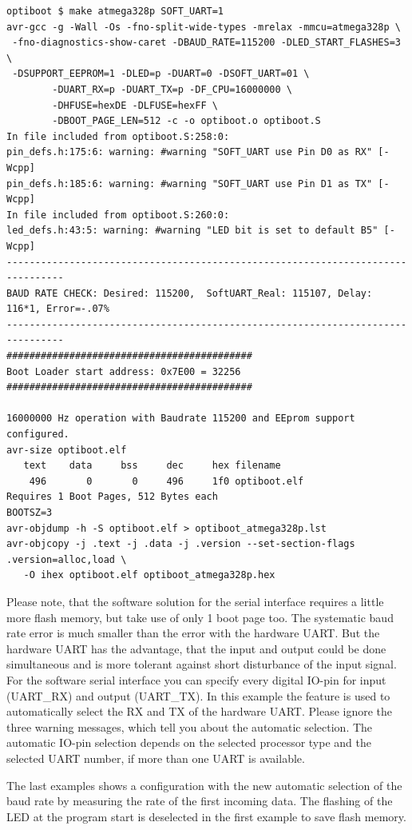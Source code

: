 \begin{verbatim}
optiboot $ make atmega328p SOFT_UART=1
avr-gcc -g -Wall -Os -fno-split-wide-types -mrelax -mmcu=atmega328p \
 -fno-diagnostics-show-caret -DBAUD_RATE=115200 -DLED_START_FLASHES=3 \
 -DSUPPORT_EEPROM=1 -DLED=p -DUART=0 -DSOFT_UART=01 \
        -DUART_RX=p -DUART_TX=p -DF_CPU=16000000 \
        -DHFUSE=hexDE -DLFUSE=hexFF \
        -DBOOT_PAGE_LEN=512 -c -o optiboot.o optiboot.S
In file included from optiboot.S:258:0:
pin_defs.h:175:6: warning: #warning "SOFT_UART use Pin D0 as RX" [-Wcpp]
pin_defs.h:185:6: warning: #warning "SOFT_UART use Pin D1 as TX" [-Wcpp]
In file included from optiboot.S:260:0:
led_defs.h:43:5: warning: #warning "LED bit is set to default B5" [-Wcpp]
--------------------------------------------------------------------------------
BAUD RATE CHECK: Desired: 115200,  SoftUART_Real: 115107, Delay: 116*1, Error=-.07%
--------------------------------------------------------------------------------
###########################################
Boot Loader start address: 0x7E00 = 32256
###########################################

16000000 Hz operation with Baudrate 115200 and EEprom support configured.
avr-size optiboot.elf
   text	   data	    bss	    dec	    hex	filename
    496	      0	      0	    496	    1f0	optiboot.elf
Requires 1 Boot Pages, 512 Bytes each
BOOTSZ=3
avr-objdump -h -S optiboot.elf > optiboot_atmega328p.lst
avr-objcopy -j .text -j .data -j .version --set-section-flags .version=alloc,load \
   -O ihex optiboot.elf optiboot_atmega328p.hex
\end{verbatim}

Please note, that the software solution for the serial interface requires a little more flash memory,
but take use of only 1 boot page too. The systematic baud rate error is much smaller than the error with the hardware UART.
But the hardware UART has the advantage, that the input and output could be done simultaneous and is more tolerant against
short disturbance of the input signal.
For the software serial interface you can specify every digital IO-pin for input (UART\_RX) and output (UART\_TX). 
In this example the feature is used to automatically select the RX and TX of the hardware UART.
Please ignore the three warning messages, which tell you about the automatic selection.
The automatic IO-pin selection depends on the selected processor type and the selected UART number, if more than
one UART is available.


The last examples shows a configuration with the new automatic selection of the baud rate
by measuring the rate of the first incoming data.
The flashing of the LED at the program start is deselected in the first example to save flash memory.

